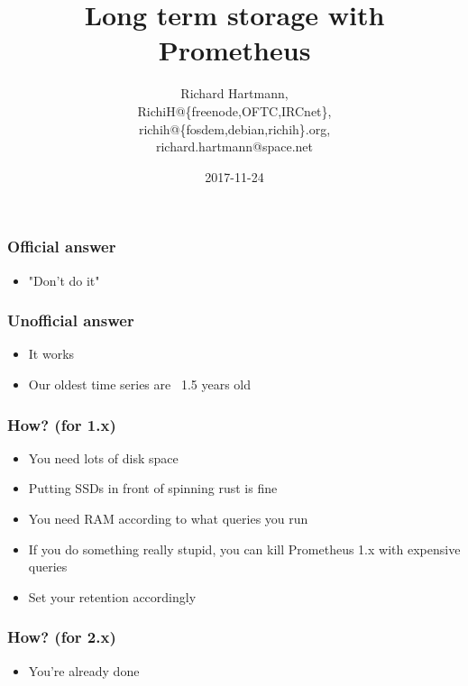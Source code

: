 \documentclass[t]{beamer}
\title{Long term storage with Prometheus}
\author{Richard Hartmann,\\
RichiH@\{freenode,OFTC,IRCnet\},\\
richih@\{fosdem,debian,richih\}.org,\\
richard.hartmann@space.net}
\date{2017-11-24}
\begin{document}
\setcounter{tocdepth}{1}

\section{}

\subsection{}

\begin{frame}
	\titlepage
\end{frame}


\subsection{}

\begin{frame}
	\frametitle{Official answer}
	\begin{itemize}
		\item "Don't do it"
	\end{itemize}
\end{frame}

\begin{frame}
	\frametitle{Unofficial answer}
	\begin{itemize}
		\item It works
		\item Our oldest time series are ~1.5 years old
	\end{itemize}
\end{frame}

\begin{frame}
	\frametitle{How? (for 1.x)}
	\begin{itemize}
		\item You need lots of disk space
		\item Putting SSDs in front of spinning rust is fine
		\item You need RAM according to what queries you run
		\item If you do something really stupid, you can kill Prometheus 1.x with expensive queries
		\item Set your retention accordingly
	\end{itemize}
\end{frame}

\begin{frame}
	\frametitle{How? (for 2.x)}
	\begin{itemize}
		\item You're already done
	\end{itemize}
\end{frame}
\end{document}
